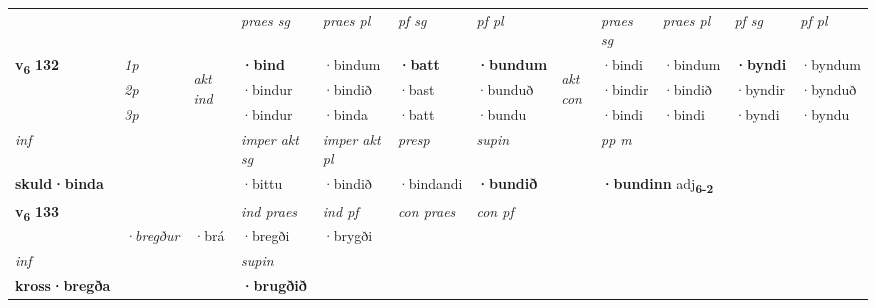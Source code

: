 \begin{longtable}[l]{X>{\footnotesize\itshape}llXXXXlXXXX}
 & &   & \textit{praes sg}  & \textit{praes pl}    & \textit{ pf sg} & \textit{pf pl} & & \textit{praes sg}  & \textit{praes pl}    & \textit{pf sg} & \textit{pf pl }  \\ \cmidrule{4-7} \cmidrule{9-12}
 \multirow{2}{*}{{{\textbf{v{\textsubscript{6}}} \Large{\textbf{132}}}}}  & 1p & \multirow{3}{*}{\begin{turn}{90}\textit{akt ind}\end{turn}} & \textbf{·bind} & ·bindum & \textbf{·batt} & \textbf{·bundum} & \multirow{3}{*}{\begin{turn}{90}\textit{akt con}\end{turn}} &·bindi & ·bindum & \textbf{·byndi} & ·byndum\\*
 & 2p &  &  ·bindur  & ·bindið & ·bast & ·bunduð & & ·bindir & ·bindið & ·byndir & ·bynduð \\*
 & 3p &  & ·bindur & ·binda & ·batt & ·bundu & & ·bindi & ·bindi& ·byndi & ·byndu \\*
\cmidrule{4-7} \cmidrule{9-12}

   {\textit{inf}} & &  & \textit{imper akt sg} & \textit{imper akt pl}   & \textit{presp} & \textit{supin}  && \textit{pp m} \\*
  {\textbf{skuld\allowbreak ·binda}} & && ·bittu  & ·bindið   & ·bindandi &  \textbf{·bundið}  && \multicolumn{2}{l}{\textbf{·bundinn} adj\textbf{\textsubscript{6-2}}} \\*

\midrule

\multirow{2}{*}{{{\textbf{v{\textsubscript{6}}} \Large{\textbf{133}}}}}  &&&  \textit{ind praes} & \textit{ind pf} & \textit{con praes} & \textit{con pf} \\*
\multicolumn{3}{r}{\textit{e-m}} & ·bregður & ·brá & ·bregði & ·brygði \\*

\cmidrule{4-7}
   {\textit{inf}} & &      & \textit{supin}   \\*
  {\textbf{kross\allowbreak ·bregða}} & &      &  \textbf{·brugðið}   \\*

\midrule


\end{longtable}
